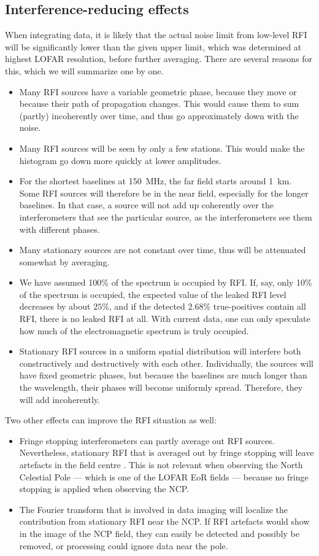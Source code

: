\documentclass[useAMS,usenatbib]{mn2e}
\begin{document}
\subsection{Interference-reducing effects} \label{sec:coherence-reduction}
When integrating data, it is likely that the actual noise limit from low-level RFI will be significantly lower than the given upper limit, which was determined at highest LOFAR resolution, before further averaging. There are several reasons for this, which we will summarize one by one.
\begin{itemize}
 \item Many RFI sources have a variable geometric phase, because they move or because their path of propagation changes. This would cause them to sum (partly) incoherently over time, and thus go approximately down with the noise.
 \item Many RFI sources will be seen by only a few stations. This would make the histogram go down more quickly at lower amplitudes.
 \item For the shortest baselines at 150~MHz, the far field starts around 1~km. Some RFI sources will therefore be in the near field, especially for the longer baselines. In that case, a source will not add up coherently over the interferometers that see the particular source, as the interferometers see them with different phases.
 \item Many stationary sources are not constant over time, thus will be attenuated somewhat by averaging.
 \item We have assumed 100\% of the spectrum is occupied by RFI. If, say, only 10\% of the spectrum is occupied, the expected value of the leaked RFI level decreases by about $25$\%, and if the detected 2.68\% true-positives contain all RFI, there is no leaked RFI at all. With current data, one can only speculate how much of the electromagnetic spectrum is truly occupied.
 \item Stationary RFI sources in a uniform spatial distribution will interfere both constructively and destructively with each other. Individually, the sources will have fixed geometric phases, but because the baselines are much longer than the wavelength, their phases will become uniformly spread. Therefore, they will add incoherently.
\end{itemize}

Two other effects can improve the RFI situation as well:
\begin{itemize}
 \item Fringe stopping interferometers can partly average out RFI sources. Nevertheless, stationary RFI that is averaged out by fringe stopping will leave artefacts in the field centre \citep{post-correlation-filtering}. This is not relevant when observing the North Celestial Pole --- which is one of the LOFAR EoR fields --- because no fringe stopping is applied when observing the NCP.
 \item The Fourier transform that is involved in data imaging will localize the contribution from stationary RFI near the NCP. If RFI artefacts would show in the image of the NCP field, they can easily be detected and possibly be removed, or processing could ignore data near the pole.
\end{itemize}
\end{document}
